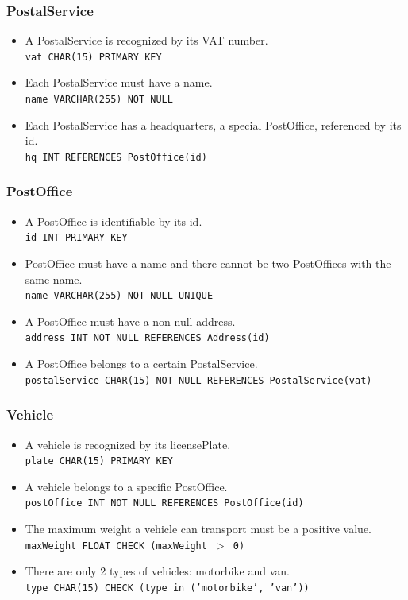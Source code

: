 \documentclass{report}[a4paper]
\theoremstyle{remark}
\begin{document}
\subsubsection{PostalService}
\begin{itemize}
    \item A PostalService is recognized by its VAT number.                                      \\ \texttt{vat CHAR(15) PRIMARY KEY}
    \item Each PostalService must have a name.                                                  \\ \texttt{name VARCHAR(255) NOT NULL}
    \item Each PostalService has a headquarters, a special PostOffice, referenced by its id.    \\ \texttt{hq INT REFERENCES PostOffice(id)}
\end{itemize}
\subsubsection{PostOffice}
\begin{itemize}
    \item A PostOffice is identifiable by its id.                                               \\ \texttt{id INT PRIMARY KEY}
    \item PostOffice must have a name and there cannot be two PostOffices with the same name.   \\ \texttt{name VARCHAR(255) NOT NULL UNIQUE}
    \item A PostOffice must have a non-null address.                                            \\ \texttt{address INT NOT NULL REFERENCES Address(id)}
    \item A PostOffice belongs to a certain PostalService.                                      \\ \texttt{postalService CHAR(15) NOT NULL REFERENCES PostalService(vat)}
\end{itemize}
\subsubsection{Vehicle}
\begin{itemize}
    \item A vehicle is recognized by its licensePlate.                                          \\ \texttt{plate CHAR(15) PRIMARY KEY}
    \item A vehicle belongs to a specific PostOffice.                                           \\ \texttt{postOffice INT NOT NULL REFERENCES PostOffice(id)}
    \item The maximum weight a vehicle can transport must be a positive value.                  \\ \texttt{maxWeight FLOAT CHECK (maxWeight $>$ 0)}
    \item There are only 2 types of vehicles: motorbike and van.                                \\ \texttt{type CHAR(15) CHECK (type in ('motorbike', 'van'))}
\end{itemize}
\end{document}

